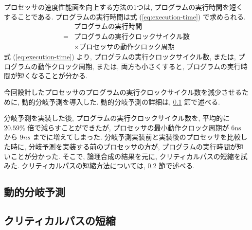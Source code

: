 \documentclass[../main.tex]{subfiles}
\begin{document}
  プロセッサの速度性能面を向上する方法の1つは, プログラムの実行時間を短くすることである.
  プログラムの実行時間は式 (\ref{eq:execution-time}) で求められる.
  \begin{equation}
    \begin{aligned}
      &プログラムの実行時間 \\
      = &プログラムの実行クロックサイクル数 \\
      &\times プロセッサの動作クロック周期
      \label{eq:execution-time}
    \end{aligned}
  \end{equation}
  式 (\ref{eq:execution-time}) より, プログラムの実行クロックサイクル数, 
  または, プログラムの動作クロック周期, 
  または, 両方も小さくすると, プログラムの実行時間が短くなることが分かる.

  今回設計したプロセッサのプログラムの実行クロックサイクル数を減少させるために, 動的分岐予測を導入した.
  動的分岐予測の詳細は, \ref{subsection:jump-prediction} 節で述べる.

  分岐予測を実装した後, プログラムの実行クロックサイクル数を, 
  平均的に $20.59\%$ 倍で減らすことができたが, 
  プロセッサの最小動作クロック周期が $6\unit{\ns}$ から $9\unit{ns}$ までに増えてしまった.
  分岐予測実装前と実装後のプロセッサを比較した時に, 
  分岐予測を実装する前のプロセッサの方が, 
  プログラムの実行時間が短いことが分かった.
  そこで, 論理合成の結果を元に, クリティカルパスの短縮を試みた.
  クリティカルパスの短縮方法については, \ref{subsection:critical-path} 節で述べる.

  \subsection{動的分岐予測} \label{subsection:jump-prediction}
  

  \subsection{クリティカルパスの短縮} \label{subsection:critical-path}
  
\end{document}
